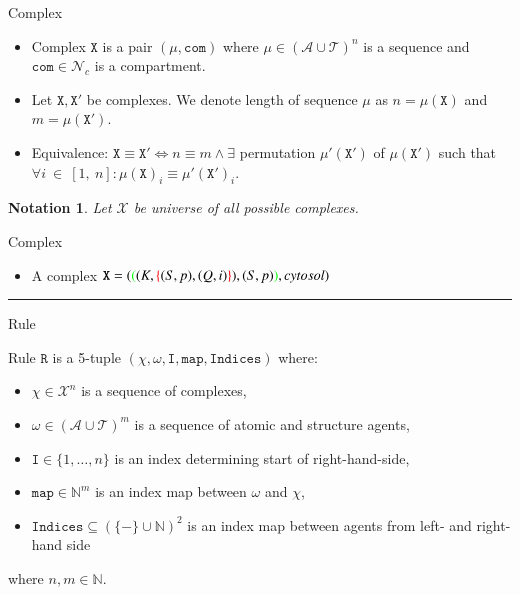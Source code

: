 \documentclass{elsarticle}
\newtheorem{notation}{Notation}
\begin{document}
\begin{definition}{Complex}

\begin{itemize}
\item Complex $\mathtt{X}$ is a pair $(\mu, \mathtt{com})$ where $\mu \in (\mathcal{A} \cup \mathcal{T})^n$ is a sequence and $\mathtt{com} \in \mathcal{N}_{c}$ is a compartment.

\item Let $\mathtt{X}, \mathtt{X}'$ be complexes. We denote length of sequence $\mu$ as $n = \mu(\mathtt{X})$ and $m = \mu(\mathtt{X}')$. 

\item Equivalence: $\mathtt{X} \equiv \mathtt{X}' \Leftrightarrow n \equiv m \wedge \exists $ permutation $ \mu'(\mathtt{X}')$ of $\mu(\mathtt{X}')$ such that $\forall i~\in~[1,~n]: \mu(\mathtt{X})_i \equiv \mu'(\mathtt{X}')_i$.
\end{itemize}
\end{definition}

\begin{notation}
Let $\mathcal{X}$ be universe of all possible complexes.
\end{notation}


\begin{example}{Complex}

\begin{itemize}
\item A complex $\mathtt{X} = (\textcolor{green}{(}(K, \textcolor{red}{\{}(S, p), (Q, i)\textcolor{red}{\}}), (S, p)\textcolor{green}{)}, cytosol)$
\end{itemize}
\end{example}

\noindent\rule{\textwidth}{1pt}

\begin{definition}{Rule}

Rule $\mathtt{R}$ is a 5-tuple $(\chi, \omega, \mathtt{I}, \mathtt{map}, \mathtt{Indices})$ where:

\begin{itemize}
\item $\chi \in \mathcal{X}^n$ is a sequence of complexes,
\item $\omega \in (\mathcal{A} \cup \mathcal{T})^m$ is a sequence of atomic and structure agents,
\item $\mathtt{I} \in \{ 1, \ldots, n \}$ is an index determining start of right-hand-side,
\item $\mathtt{map} \in \mathbb{N}^m$ is an index map between $\omega$ and $\chi$,
\item $\mathtt{Indices} \subseteq (\{-\} \cup \mathbb{N})^2$ is an index map between agents from left- and right-hand side
\end{itemize}

where $n, m \in \mathbb{N}$.
\end{definition}
\end{document}
